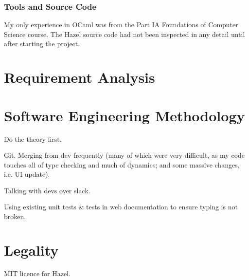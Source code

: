 \subsubsection{Tools and Source Code}
My only experience in OCaml was from the Part IA Foundations of Computer Science course. The Hazel source code had not been inspected in any detail until after starting the project.

\section{Requirement Analysis}\label{sec:RequirementAnalysis}

\section{Software Engineering Methodology}\label{sec:EngineeringMethodology}
Do the theory first. 

Git. Merging from dev frequently (many of which were very difficult, as my code touches all of type checking and much of dynamics; and some massive changes, i.e. UI update). 

Talking with devs over slack.

Using existing unit tests \& tests in web documentation to ensure typing is not broken.

\section{Legality}\label{sec:Legality}
MIT licence for Hazel.
